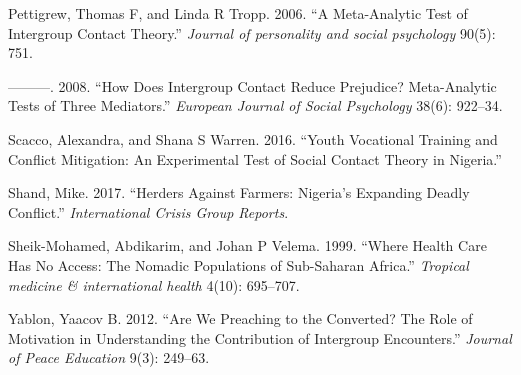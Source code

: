 \documentclass[11pt]{article}
\begin{document}
\hypertarget{ref-pettigrew2006meta}{}
Pettigrew, Thomas F, and Linda R Tropp. 2006. ``A Meta-Analytic Test of
Intergroup Contact Theory.'' \emph{Journal of personality and social
psychology} 90(5): 751.

\hypertarget{ref-pettigrew2008does}{}
---------. 2008. ``How Does Intergroup Contact Reduce Prejudice?
Meta-Analytic Tests of Three Mediators.'' \emph{European Journal of
Social Psychology} 38(6): 922--34.

\hypertarget{ref-Scacco2016}{}
Scacco, Alexandra, and Shana S Warren. 2016. ``Youth Vocational Training
and Conflict Mitigation: An Experimental Test of Social Contact Theory
in Nigeria.''

\hypertarget{ref-icg2017herder}{}
Shand, Mike. 2017. ``Herders Against Farmers: Nigeria's Expanding Deadly
Conflict.'' \emph{International Crisis Group Reports}.

\hypertarget{ref-sheik1999health}{}
Sheik-Mohamed, Abdikarim, and Johan P Velema. 1999. ``Where Health Care
Has No Access: The Nomadic Populations of Sub-Saharan Africa.''
\emph{Tropical medicine \& international health} 4(10): 695--707.

\hypertarget{ref-yablon2012we}{}
Yablon, Yaacov B. 2012. ``Are We Preaching to the Converted? The Role of
Motivation in Understanding the Contribution of Intergroup Encounters.''
\emph{Journal of Peace Education} 9(3): 249--63.
\end{document}
